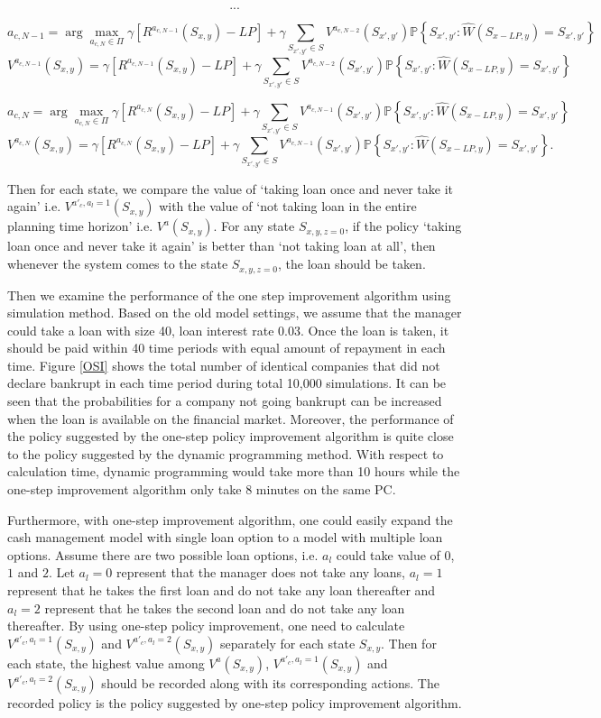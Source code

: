 \documentclass[12pt]{article}
\begin{document}
$$...$$

$$a_{c,N-1} = \arg \max_{a_{c,N} \in \Pi} \gamma [R^{a_{c,N-1}} (S_{x,y}) - LP] + \gamma  \sum_{S_{x',y'}\in S} V^{a_{c,N-2}}(S_{x',y'}) \mathbb{P}\left\{S_{x',y'}:\widehat{W}(S_{x-LP, y}) = S_{x', y'} \right\}$$
$$ V^{a_{c,N-1}}(S_{x,y}) = \gamma [R^{a_{c,N-1}} (S_{x,y}) - LP] + \gamma  \sum_{S_{x',y'}\in S} V^{a_{c,N-2}}(S_{x',y'}) \mathbb{P}\left\{S_{x',y'}:\widehat{W}(S_{x-LP, y}) = S_{x', y'} \right\}$$

$$a_{c,N} = \arg \max_{a_{c,N} \in \Pi} \gamma [R^{a_{c,N}} (S_{x,y}) - LP] + \gamma  \sum_{S_{x',y'}\in S} V^{a_{c,N-1}}(S_{x',y'}) \mathbb{P}\left\{S_{x',y'}:\widehat{W}(S_{x-LP, y}) = S_{x', y'} \right\}$$
$$ V^{a_{c,N}}(S_{x,y}) = \gamma [R^{a_{c,N}} (S_{x,y}) - LP] + \gamma  \sum_{S_{x',y'}\in S} V^{a_{c,N-1}}(S_{x',y'}) \mathbb{P}\left\{S_{x',y'}:\widehat{W}(S_{x-LP, y}) = S_{x', y'} \right\}.$$

Then for each state, we compare the value of `taking loan once and never take it again' i.e. $V^{a'_c,a_l = 1}(S_{x,y})$ with the value of `not taking loan in the entire planning time horizon' i.e. $V^a(S_{x,y})$. For any state $S_{x,y,z=0}$, if the policy `taking loan once and never take it again' is better than `not taking loan at all', then whenever the system comes to the state $S_{x,y,z=0}$, the loan should be taken.

Then we examine the performance of the one step improvement algorithm using simulation method. Based on the old model settings, we assume that the manager could take a loan with size 40, loan interest rate 0.03. Once the loan is taken, it should be paid within 40 time periods with equal amount of repayment in each time. Figure \ref{OSI} shows the total number of identical companies that did not declare bankrupt in each time period during total 10,000 simulations. It can be seen that the probabilities for a company not going bankrupt can be increased when the loan is available on the financial market. Moreover, the performance of the policy suggested by the one-step policy improvement algorithm is quite close to the policy suggested by the dynamic programming method. With respect to calculation time, dynamic programming would take more than 10 hours while the one-step improvement algorithm only take 8 minutes on the same PC. 

Furthermore, with one-step improvement algorithm, one could easily expand the cash management model with single loan option to a model with multiple loan options. Assume there are two possible loan options, i.e. $a_l$ could take value of $0$, $1$ and $2$. Let $a_l = 0$ represent that the manager does not take any loans, $a_l=1$ represent that he takes the first loan and do not take any loan thereafter and $a_l=2$ represent that he takes the second loan and do not take any loan thereafter. By using one-step policy improvement, one need to calculate $V^{a'_c, a_l=1}(S_{x,y})$ and $V^{a'_c, a_l=2}(S_{x,y})$ separately for each state $S_{x,y}$. Then for each state, the highest value among $V^a(S_{x,y})$, $V^{a'_c, a_l=1}(S_{x,y})$ and $V^{a'_c, a_l=2}(S_{x,y})$ should be recorded along with its corresponding actions. The recorded policy is the policy suggested by one-step policy improvement algorithm. 
\end{document}
